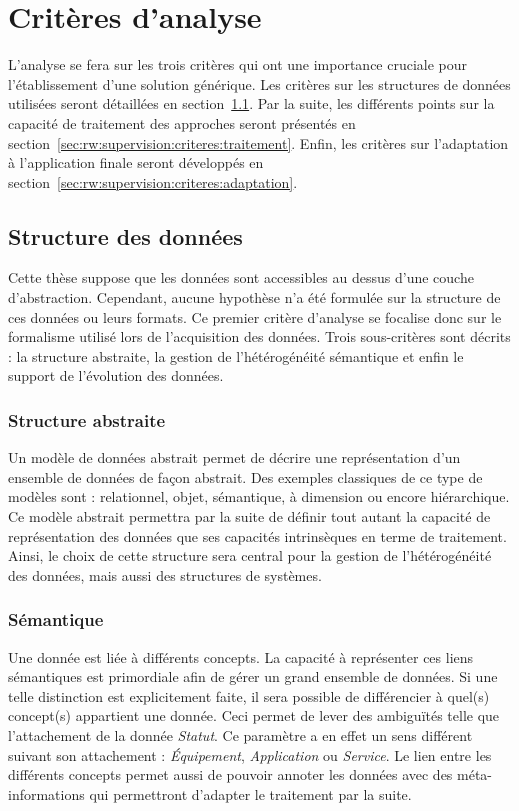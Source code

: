 \section{Critères d'analyse}\label{sec:rw:supervision:criteres}
L'analyse se fera sur les trois critères qui ont une importance cruciale pour l'établissement d'une solution générique. Les critères sur les structures de données utilisées seront détaillées en section~\ref{sec:rw:supervision:criteres:structure}. Par la suite, les différents points sur la capacité de traitement des approches seront présentés en section~\ref{sec:rw:supervision:criteres:traitement}. Enfin, les critères sur l'adaptation à l'application finale seront développés en section~\ref{sec:rw:supervision:criteres:adaptation}.

\subsection{Structure des données}\label{sec:rw:supervision:criteres:structure}
Cette thèse suppose que les données sont accessibles au dessus d'une couche d'abstraction. Cependant, aucune hypothèse n'a été formulée sur la structure de ces données ou leurs formats. Ce premier critère d'analyse se focalise donc sur le formalisme utilisé lors de l'acquisition des données. Trois sous-critères sont décrits : la structure abstraite, la gestion de l'hétérogénéité sémantique et enfin le support de l'évolution des données.

\subsubsection{Structure abstraite}
Un modèle de données abstrait permet de décrire une représentation d'un ensemble de données de façon abstrait. Des exemples classiques de ce type de modèles sont : relationnel, objet, sémantique, à dimension ou encore hiérarchique. Ce modèle abstrait permettra par la suite de définir tout autant la capacité de représentation des données que ses capacités intrinsèques en terme de traitement. Ainsi, le choix de cette structure sera central pour la gestion de l'hétérogénéité des données, mais aussi des structures de systèmes.
\subsubsection{Sémantique}
Une donnée est liée à différents concepts. La capacité à représenter ces liens sémantiques est primordiale afin de gérer un grand ensemble de données. Si une telle distinction est explicitement faite, il sera possible de différencier à quel(s) concept(s) appartient une donnée. Ceci permet de lever des ambiguïtés telle que l'attachement de la donnée \textit{Statut}. Ce paramètre a en effet un sens différent suivant son attachement : \textit{Équipement}, \textit{Application} ou \textit{Service}. Le lien entre les différents concepts permet aussi de pouvoir annoter les données avec des méta-informations qui permettront d'adapter le traitement par la suite.

